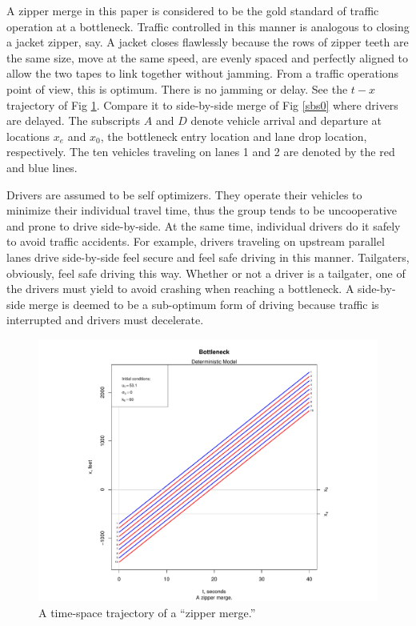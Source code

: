 \documentclass[Proceedings]{ascelike}
\begin{document}
A zipper merge in this paper is considered to be the gold standard of traffic operation at a bottleneck.  Traffic controlled  in this manner is analogous to  closing a jacket zipper, say. A jacket closes flawlessly because the rows of zipper teeth are the same size, move at the same speed, are evenly spaced and perfectly aligned to allow the two tapes to link together without jamming. From a traffic operations point of view, this is optimum. There is no jamming or delay. See the $t-x$ trajectory of Fig \ref{zip0}. Compare it to side-by-side merge of Fig \ref{sbs0} where drivers are delayed. The subscripts $A$ and $D$ denote  vehicle arrival and departure at locations $x_e$ and $x_0$, the bottleneck entry location and lane drop location, respectively. The ten vehicles traveling on lanes 1 and 2 are denoted by the red and blue lines. 

Drivers are assumed to be self optimizers.  They operate their vehicles to minimize their individual travel time, thus the group tends to be uncooperative and prone to drive side-by-side. At the same time, individual drivers do it safely to avoid traffic accidents. For example, drivers traveling on upstream parallel lanes drive side-by-side feel secure and feel safe driving in this manner. Tailgaters, obviously, feel safe driving this way. Whether or not a driver is a tailgater, one of the drivers must yield to avoid crashing when reaching a bottleneck. A side-by-side merge is deemed to be a sub-optimum form of driving because traffic is interrupted and drivers must decelerate.  

\begin{figure}
\centering
\includegraphics[width = 5.5in]{Rplot01.pdf}
\caption{A time-space trajectory of a  ``zipper merge.'' }
\label{zip0}
\end{figure}
\end{document}
